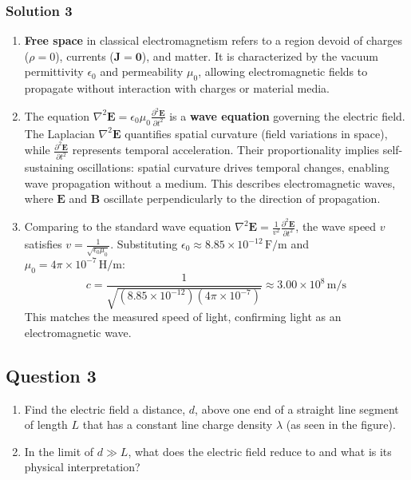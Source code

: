 \documentclass{article}
\begin{document}
\subsubsection{Solution 3}
\begin{enumerate}
    \item \textbf{Free space} in classical electromagnetism refers to a region devoid of charges (\(\rho = 0\)), currents (\(\mathbf{J} = \mathbf{0}\)), and matter. It is characterized by the vacuum permittivity \(\epsilon_0\) and permeability \(\mu_0\), allowing electromagnetic fields to propagate without interaction with charges or material media.

    \item The equation \(\nabla^2 \mathbf{E} = \epsilon_0 \mu_0 \frac{\partial^2 \mathbf{E}}{\partial t^2}\) is a \textbf{wave equation} governing the electric field. The Laplacian \(\nabla^2 \mathbf{E}\) quantifies spatial curvature (field variations in space), while \(\frac{\partial^2 \mathbf{E}}{\partial t^2}\) represents temporal acceleration. Their proportionality implies self-sustaining oscillations: spatial curvature drives temporal changes, enabling wave propagation without a medium. This describes electromagnetic waves, where \(\mathbf{E}\) and \(\mathbf{B}\) oscillate perpendicularly to the direction of propagation.

    \item Comparing to the standard wave equation \(\nabla^2 \mathbf{E} = \frac{1}{v^2} \frac{\partial^2 \mathbf{E}}{\partial t^2}\), the wave speed \(v\) satisfies \(v = \frac{1}{\sqrt{\epsilon_0 \mu_0}}\). Substituting \(\epsilon_0 \approx 8.85 \times 10^{-12} \, \mathrm{F/m}\) and \(\mu_0 = 4\pi \times 10^{-7} \, \mathrm{H/m}\):
    \[
    c = \frac{1}{\sqrt{(8.85 \times 10^{-12})(4\pi \times 10^{-7})}} \approx 3.00 \times 10^8 \, \mathrm{m/s}
    \]
    This matches the measured speed of light, confirming light as an electromagnetic wave.
\end{enumerate}


\subsection{Question 3}
\begin{enumerate}
    \item Find the electric field a distance, \( d \), above one end of a straight line segment of length \( L \) that has a constant line charge density \( \lambda \) (as seen in the figure).
    \item In the limit of \( d \gg L \), what does the electric field reduce to and what is its physical interpretation?
\end{enumerate}
\end{document}
